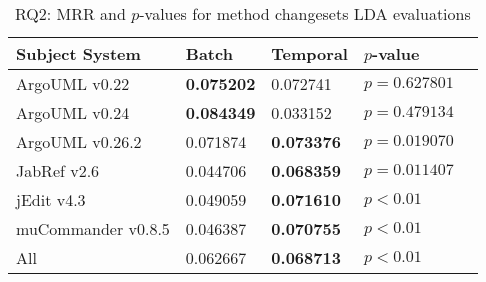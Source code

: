 
\begin{table}[t]
\renewcommand{\arraystretch}{1.3}
\footnotesize
\centering
\caption{RQ2: MRR and $p$-values for method changesets LDA evaluations}
\begin{tabular}{l|ll|ll}
   \toprule
    Subject System & Batch & Temporal & $p$-value  \\
    \midrule

ArgoUML v0.22 & {\bf 0.075202 } & 0.072741 & $p = 0.627801$ \\
ArgoUML v0.24 & {\bf 0.084349 } & 0.033152 & $p = 0.479134$ \\
ArgoUML v0.26.2 & 0.071874 & {\bf 0.073376 } & $p = 0.019070$ \\
JabRef v2.6 & 0.044706 & {\bf 0.068359 } & $p = 0.011407$ \\
jEdit v4.3 & 0.049059 & {\bf 0.071610 } & $p < 0.01$ \\
muCommander v0.8.5 & 0.046387 & {\bf 0.070755 } & $p < 0.01$ \\
\midrule
All & 0.062667 & {\bf 0.068713 } & $p < 0.01$ \\

    \bottomrule
\end{tabular}
\label{table:rq2:method:lda}
\end{table}

